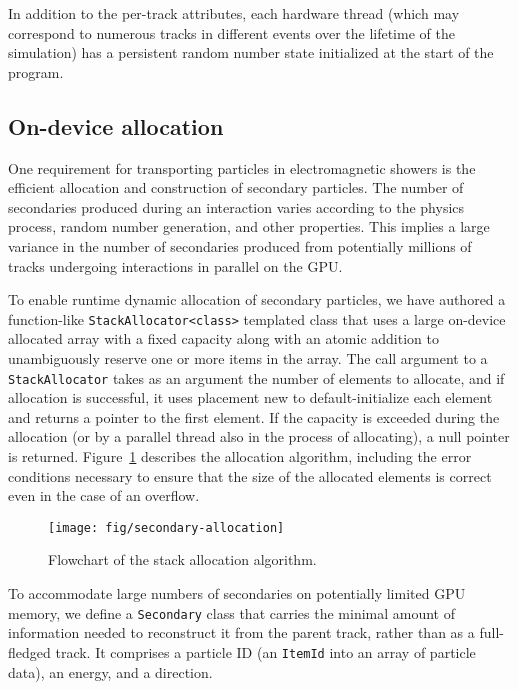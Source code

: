 In addition to the per-track attributes, each hardware thread
(which may correspond to numerous tracks in different events over the lifetime
of the simulation) has a persistent random number state initialized at the start
of the program.

\subsection{On-device allocation}\label{on-device-allocation}

One requirement for transporting particles in electromagnetic showers is
the efficient allocation and construction of secondary particles. The
number of secondaries produced during an interaction varies according to
the physics process, random number generation, and other properties.
This implies a large variance in the number of secondaries produced from
potentially millions of tracks undergoing interactions in parallel on
the GPU.

To enable runtime dynamic allocation of secondary particles, we have
authored a function-like
\texttt{StackAllocator\textless{}class\textgreater{}} templated class
that uses a large on-device allocated array with a fixed capacity along
with an atomic addition to unambiguously reserve one or more items in
the array. The call argument to a \texttt{StackAllocator} takes as an
argument the number of elements to allocate, and if allocation is
successful, it uses placement new to default-initialize each element and
returns a pointer to the first element. If the capacity is exceeded
during the allocation (or by a parallel thread also in the process of
allocating), a null pointer is returned. Figure~\ref{fig:secondary} describes
the allocation algorithm, including the error conditions necessary to ensure
that the size of the allocated elements is correct even in the case of an
overflow.
%
\begin{figure}[htb]
  \centering
  \texttt{[image: fig/secondary-allocation]}
  \caption{Flowchart of the stack allocation algorithm.}
  \label{fig:secondary}
\end{figure}

To accommodate large numbers of secondaries on potentially limited GPU
memory, we define a \texttt{Secondary} class that carries the minimal
amount of information needed to reconstruct it from the parent track,
rather than as a full-fledged track. It comprises a particle ID (an
\texttt{ItemId} into an array of particle data), an energy, and a direction.

